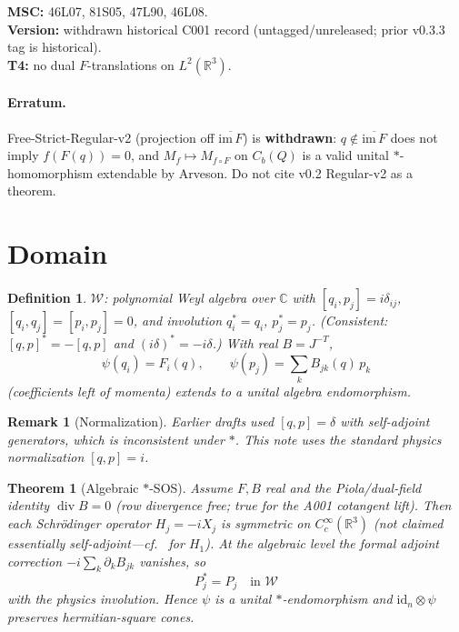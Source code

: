 \documentclass[11pt]{article}
\newtheorem{theorem}{Theorem}
\newtheorem{definition}{Definition}
\newtheorem{remark}{Remark}
\begin{document}
\noindent\textbf{MSC:} 46L07, 81S05, 47L90, 46L08.\\
\textbf{Version:} withdrawn historical C001 record
(untagged/unreleased; prior v0.3.3 tag is historical).\\
\textbf{T4:} no dual \(F\)-translations on \(L^2(\mathbb{R}^3)\).

\paragraph{Erratum.}
Free-Strict-Regular-v2 (projection off \(\overline{\mathrm{im}\,F}\)) is
\textbf{withdrawn}: \(q\notin\overline{\mathrm{im}\,F}\) does not imply
\(f(F(q))=0\), and \(M_f\mapsto M_{f\circ F}\) on \(C_b(Q)\) is a valid unital
\(*\)-homomorphism extendable by Arveson. Do not cite v0.2 Regular-v2 as a theorem.

\section{Domain}
\begin{definition}
\(\mathcal{W}\): polynomial Weyl algebra over \(\mathbb{C}\) with
\([q_i,p_j]=i\delta_{ij}\), \([q_i,q_j]=[p_i,p_j]=0\), and involution
\(q_i^*=q_i\), \(p_j^*=p_j\). (Consistent: \([q,p]^*=-[q,p]\) and
\((i\delta)^*=-i\delta\).) With real \(B=J^{-T}\),
\[
\psi(q_i)=F_i(q),\qquad
\psi(p_j)=\sum_k B_{jk}(q)\,p_k
\]
(coefficients left of momenta) extends to a unital algebra endomorphism.
\end{definition}

\begin{remark}[Normalization]
Earlier drafts used \([q,p]=\delta\) with self-adjoint generators, which is
inconsistent under \(*\). This note uses the standard physics normalization
\([q,p]=i\).
\end{remark}

\begin{theorem}[Algebraic \(*\)-SOS]
Assume \(F,B\) real and the Piola/\allowbreak dual-field identity \(\operatorname{div} B=0\)
(row divergence free; true for the A001 cotangent lift). Then each
Schr\"odinger operator \(H_j=-iX_j\) is \emph{symmetric} on \(C_c^\infty(\mathbb{R}^3)\)
(not claimed essentially self-adjoint---cf.~\cite{A001} for \(H_1\)).
At the algebraic level the formal adjoint correction
\(-i\sum_k\partial_k B_{jk}\) vanishes, so
\[
P_j^* = P_j
\quad\text{in }\mathcal{W}
\]
with the physics involution. Hence \(\psi\) is a unital \(*\)-endomorphism and
\(\mathrm{id}_n\otimes\psi\) preserves hermitian-square cones.
\end{theorem}
\end{document}
